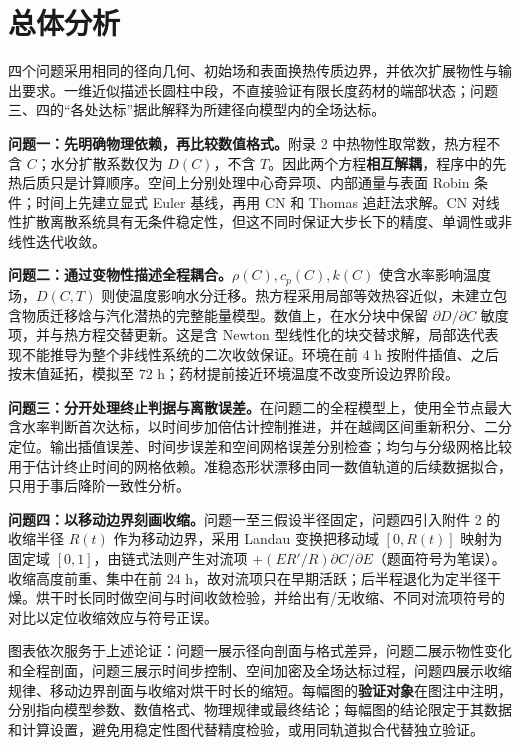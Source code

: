 \section{总体分析}
四个问题采用相同的径向几何、初始场和表面换热传质边界，并依次扩展物性与输出要求。一维近似描述长圆柱中段，不直接验证有限长度药材的端部状态；问题三、四的“各处达标”据此解释为所建径向模型内的全场达标。

\textbf{问题一：先明确物理依赖，再比较数值格式。}附录 2 中热物性取常数，热方程不含 $C$；水分扩散系数仅为 $D(C)$，不含 $T$。因此两个方程\textbf{相互解耦}，程序中的先热后质只是计算顺序。空间上分别处理中心奇异项、内部通量与表面 Robin 条件；时间上先建立显式 Euler 基线，再用 CN 和 Thomas 追赶法求解。CN 对线性扩散离散系统具有无条件稳定性，但这不同时保证大步长下的精度、单调性或非线性迭代收敛。

\textbf{问题二：通过变物性描述全程耦合。}$\rho(C),c_p(C),k(C)$ 使含水率影响温度场，$D(C,T)$ 则使温度影响水分迁移。热方程采用局部等效热容近似，未建立包含物质迁移焓与汽化潜热的完整能量模型。数值上，在水分块中保留 $\partial D/\partial C$ 敏度项，并与热方程交替更新。这是含 Newton 型线性化的块交替求解，局部迭代表现不能推导为整个非线性系统的二次收敛保证。环境在前 $4$ h 按附件插值、之后按末值延拓，模拟至 $72$ h；药材提前接近环境温度不改变所设边界阶段。

\textbf{问题三：分开处理终止判据与离散误差。}在问题二的全程模型上，使用全节点最大含水率判断首次达标，以时间步加倍估计控制推进，并在越阈区间重新积分、二分定位。输出插值误差、时间步误差和空间网格误差分别检查；均匀与分级网格比较用于估计终止时间的网格依赖。准稳态形状漂移由同一数值轨道的后续数据拟合，只用于事后降阶一致性分析。

\textbf{问题四：以移动边界刻画收缩。}问题一至三假设半径固定，问题四引入附件 2 的收缩半径 $R(t)$ 作为移动边界，采用 Landau 变换把移动域 $[0,R(t)]$ 映射为固定域 $[0,1]$，由链式法则产生对流项 $+(E R'/R)\partial C/\partial E$（题面符号为笔误）。收缩高度前重、集中在前 $24$ h，故对流项只在早期活跃；后半程退化为定半径干燥。烘干时长同时做空间与时间收敛检验，并给出有/无收缩、不同对流项符号的对比以定位收缩效应与符号正误。

图表依次服务于上述论证：问题一展示径向剖面与格式差异，问题二展示物性变化和全程剖面，问题三展示时间步控制、空间加密及全场达标过程，问题四展示收缩规律、移动边界剖面与收缩对烘干时长的缩短。每幅图的\textbf{验证对象}在图注中注明，分别指向模型参数、数值格式、物理规律或最终结论；每幅图的结论限定于其数据和计算设置，避免用稳定性图代替精度检验，或用同轨道拟合代替独立验证。
